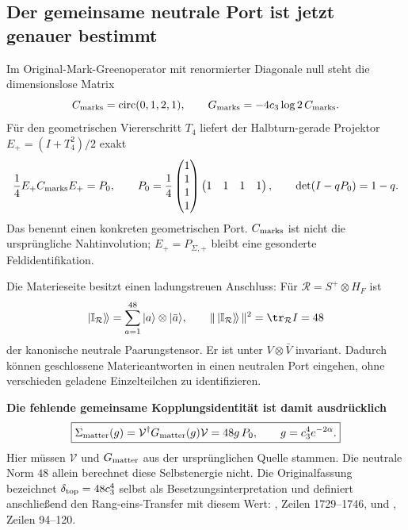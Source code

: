 \subsection{Der gemeinsame neutrale Port ist jetzt genauer bestimmt}\label{sec:neutralport}
Im Original-Mark-Greenoperator mit renormierter Diagonale null steht die dimensionslose Matrix
\begin{equation}
C_{\rm marks}=\operatorname{circ}(0,1,2,1),\qquad
G_{\rm marks}=-4c_3\log2\,C_{\rm marks}.
\end{equation}
Für den geometrischen Viererschritt $T_4$ liefert der Halbturn-gerade Projektor $E_+=(I+T_4^2)/2$ exakt
\begin{equation}
\frac14E_+C_{\rm marks}E_+=P_0,\qquad
P_0=\frac14\begin{pmatrix}1\\1\\1\\1\end{pmatrix}
\begin{pmatrix}1&1&1&1\end{pmatrix},
\qquad \det(I-qP_0)=1-q.
\end{equation}
Das benennt einen konkreten geometrischen Port. $C_{\rm marks}$ ist nicht die ursprüngliche Nahtinvolution; $E_+=P_{\Sigma,+}$ bleibt eine gesonderte Feldidentifikation.

Die Materieseite besitzt einen ladungstreuen Anschluss: Für $\mathcal R=S^+\otimes H_F$ ist
\begin{equation}
|\mathbb I_{\mathcal R}\rangle\!\rangle
=\sum_{a=1}^{48}|a\rangle\otimes|\bar a\rangle,\qquad
\|\,|\mathbb I_{\mathcal R}\rangle\!\rangle\,\|^2
=\tr_{\mathcal R}I=48
\end{equation}
der kanonische neutrale Paarungstensor. Er ist unter $V\otimes\bar V$ invariant. Dadurch können geschlossene Materieantworten in einen neutralen Port eingehen, ohne verschieden geladene Einzelteilchen zu identifizieren.

\textbf{Die fehlende gemeinsame Kopplungsidentität ist damit ausdrücklich}
\begin{equation}\label{eq:neutralselfenergy}
\boxed{\Sigma_{\rm matter}(g)
=\mathcal V^\dagger G_{\rm matter}(g)\mathcal V
=48g\,P_0,\qquad g=c_3^4e^{-2\alpha}.}
\end{equation}
Hier müssen $\mathcal V$ und $G_{\rm matter}$ aus der ursprünglichen Quelle stammen. Die neutrale Norm $48$ allein berechnet diese Selbstenergie nicht. Die Originalfassung bezeichnet $\delta_{\rm top}=48c_3^4$ selbst als Besetzungsinterpretation und definiert anschließend den Rang-eins-Transfer mit diesem Wert: , Zeilen 1729--1746, und , Zeilen 94--120.

